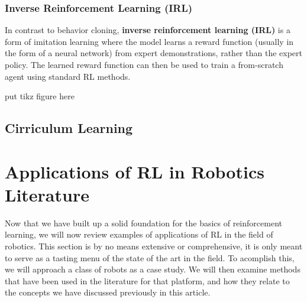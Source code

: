 \documentclass[12pt]{report}
\theoremstyle{definition}
\theoremstyle{remark}
\begin{document}
\subsection{Inverse Reinforcement Learning (IRL)}
In contrast to behavior cloning, \textbf{inverse reinforcement learning (IRL)} is a form of imitation learning where the model learns a reward function (usually in the form of a neural network) from expert demonstrations, rather than the expert policy. The learned reward function can then be used to train a from-scratch agent using standard RL methods.

put tikz figure here

\section{Cirriculum Learning}
\cite{narvekar_curriculum_2020}

\cite{arora_survey_2021}

\chapter{Applications of RL in Robotics Literature}
Now that we have built up a solid foundation for the basics of reinforcement learning, we will now review examples of applications of RL in the field of robotics. This section is by no means extensive or comprehensive, it is only meant to serve as a tasting menu of the state of the art in the field. To acomplish this, we will approach a class of robots as a case study. We will then examine methods that have been used in the literature for that platform, and how they relate to the concepts we have discussed previously in this article.
\end{document}
